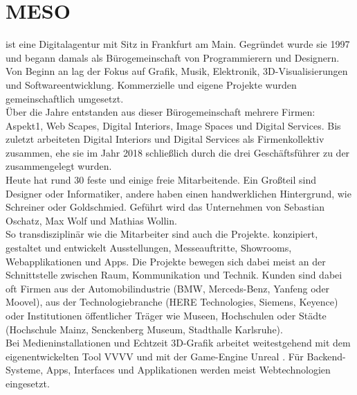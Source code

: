 \section{MESO}
\label{sec:meso}

\mesoFull{} ist eine Digitalagentur mit Sitz in Frankfurt am Main.
Gegründet wurde sie 1997 und begann damals als Bürogemeinschaft von Programmierern
und Designern. Von Beginn an lag der Fokus auf Grafik, Musik, Elektronik, 3D-Visualisierungen
und Softwareentwicklung. Kommerzielle und eigene Projekte wurden gemeinschaftlich
umgesetzt.\\

Über die Jahre entstanden aus dieser Bürogemeinschaft mehrere Firmen: Aspekt1, \meso{} Web Scapes, \meso{}
Digital Interiors, \meso{} Image Spaces und \meso{} Digital Services. Bis zuletzt arbeiteten 
\meso{} Digital Interiors und \meso{} Digital Services als Firmenkollektiv zusammen, 
ehe sie im Jahr 2018 schließlich durch die drei Geschäftsführer zu der \mesoFull{} zusammengelegt
wurden.\\
Heute hat \meso{} rund 30 feste und einige freie Mitarbeitende. Ein Großteil sind Designer oder Informatiker, 
andere haben einen handwerklichen Hintergrund, wie Schreiner oder Goldschmied. 
Geführt wird das Unternehmen von Sebastian Oschatz, Max Wolf und Mathias Wollin.\\
So transdisziplinär wie die Mitarbeiter sind auch die Projekte. \meso{} konzipiert, gestaltet und entwickelt
Ausstellungen, Messeauftritte, Showrooms, Webapplikationen und Apps. Die Projekte bewegen sich dabei meist an der
Schnittstelle zwischen Raum, Kommunikation und Technik. Kunden sind dabei oft Firmen aus der
Automobilindustrie (BMW, Merceds-Benz, Yanfeng oder Moovel), aus der Technologiebranche (HERE Technologies,
Siemens, Keyence) oder Institutionen öffentlicher Träger wie Museen, Hochschulen oder Städte (Hochschule Mainz,
Senckenberg Museum, Stadthalle Karlsruhe).\\

Bei Medieninstallationen und Echtzeit 3D-Grafik arbeitet \meso{} weitestgehend mit dem eigenentwickelten 
Tool VVVV \cite{vvvv} und mit der Game-Engine Unreal \cite{unreal}. Für Backend-Systeme, Apps, Interfaces
und Applikationen werden meist Webtechnologien eingesetzt.
